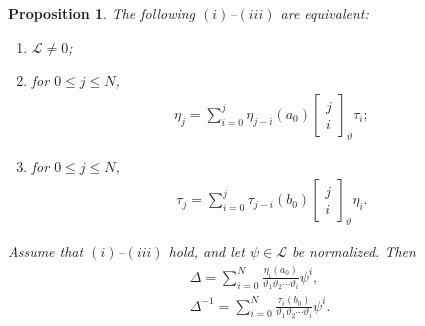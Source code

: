 \documentclass[pdftex]{sigma}
\numberwithin{equation}{section}
\newtheorem{Proposition}[Theorem]{Proposition}
\begin{document}
\begin{Proposition}\label{prop:tfae4}
The following $(i)$--$(iii)$ are equivalent:
\begin{enumerate}\itemsep=0pt
\item[$(i)$] $\mathcal L \not=0$;
\item[$(ii)$] for $0 \leq j\leq N$,
\begin{gather}
\eta_j = \sum_{i=0}^j \eta_{j-i} (a_0)
\left[\begin{matrix} j \\
i \end{matrix} \right]_\vartheta \tau_i;
\label{eq:etaSum}
\end{gather}
\item[$(iii)$] for $0 \leq j\leq N$,
\begin{gather*}
\tau_j = \sum_{i=0}^j \tau_{j-i} (b_0)
\left[\begin{matrix} j \\
i \end{matrix} \right]_\vartheta \eta_i.
\end{gather*}
\end{enumerate}
Assume that $(i)$--$(iii)$ hold, and let
$\psi \in \mathcal L$ be normalized. Then
\begin{gather}
\label{eq:DSum}
\Delta = \sum_{i=0}^N \frac{\eta_i(a_0)}{\vartheta_1 \vartheta_2 \cdots\vartheta_i} \psi^i,\\
\label{eq:DiSum}
\Delta^{-1}= \sum_{i=0}^N \frac{\tau_i(b_0)}{\vartheta_1 \vartheta_2 \cdots\vartheta_i} \psi^i.
\end{gather}
\end{Proposition}
\end{document}
